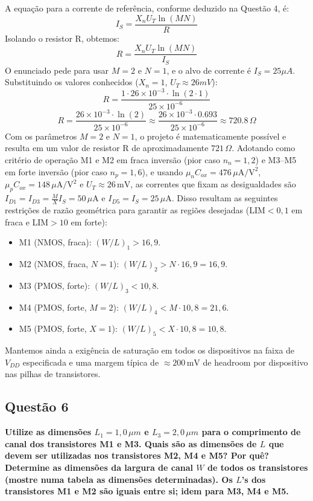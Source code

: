 ﻿\documentclass[12pt,a4paper]{article}
\begin{document}
A equação para a corrente de referência, conforme deduzido na Questão 4, é:
\[ I_S = \frac{X_n U_T \ln(MN)}{R} \]
Isolando o resistor R, obtemos:
\[ R = \frac{X_n U_T \ln(MN)}{I_S} \]
O enunciado pede para usar $M=2$ e $N=1$, e o alvo de corrente é $I_S = 25\mu A$. Substituindo os valores conhecidos ($X_n=1$, $U_T \approx 26mV$):
\[ R = \frac{1 \cdot 26 \times 10^{-3} \cdot \ln(2 \cdot 1)}{25 \times 10^{-6}} \]
\[ R = \frac{26 \times 10^{-3} \cdot \ln(2)}{25 \times 10^{-6}} \approx \frac{26 \times 10^{-3} \cdot 0.693}{25 \times 10^{-6}} \approx 720.8 \, \Omega \]
Com os parâmetros $M=2$ e $N=1$, o projeto é matematicamente possível e resulta em um valor de resistor R de aproximadamente $721 \, \Omega$. Adotando como critério de operação M1 e M2 em fraca inversão (pior caso $n_n=1{,}2$) e M3–M5 em forte inversão (pior caso $n_p=1{,}6$), e usando $\mu_n C_{ox}=476\,\mu\text{A}/\text{V}^2$, $\mu_p C_{ox}=148\,\mu\text{A}/\text{V}^2$ e $U_T\approx 26\,\text{mV}$, as correntes que fixam as desigualdades são $I_{D1}=I_{D3}=\tfrac{M}{X}I_S=50\,\mu\text{A}$ e $I_{D5}=I_S=25\,\mu\text{A}$. Disso resultam as seguintes restrições de razão geométrica para garantir as regiões desejadas (LIM$<0{,}1$ em fraca e LIM$>10$ em forte):
\begin{itemize}
    \item M1 (NMOS, fraca): $(W/L)_1 > 16{,}9$.
    \item M2 (NMOS, fraca, $N=1$): $(W/L)_2 > N\cdot 16{,}9 = 16{,}9$.
    \item M3 (PMOS, forte): $(W/L)_3 < 10{,}8$.
    \item M4 (PMOS, forte, $M=2$): $(W/L)_4 < M\cdot 10{,}8 = 21{,}6$.
    \item M5 (PMOS, forte, $X=1$): $(W/L)_5 < X\cdot 10{,}8 = 10{,}8$.
\end{itemize}
Mantemos ainda a exigência de saturação em todos os dispositivos na faixa de $V_{DD}$ especificada e uma margem típica de $\approx 200\,\text{mV}$ de headroom por dispositivo nas pilhas de transistores.

\subsection*{Questão 6}
    	\textbf{Utilize as dimensões $L_1 = 1{,}0\,\mu m$ e $L_3 = 2{,}0\,\mu m$ para o comprimento de canal dos transistores M1 e M3. Quais são as dimensões de $L$ que devem ser utilizadas nos transistores M2, M4 e M5? Por quê? Determine as dimensões da largura de canal $W$ de todos os transistores (mostre numa tabela as dimensões determinadas). Os $L$’s dos transistores M1 e M2 são iguais entre si; idem para M3, M4 e M5.}\\
\end{document}

